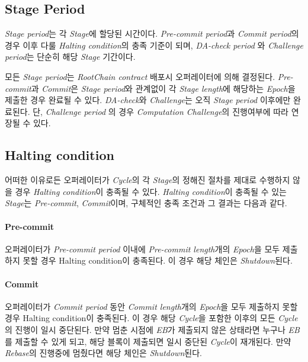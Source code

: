 \documentclass[letterpaper, 11pt]{article}
\begin{document}
\subsection{Stage Period}
\begin{CJK}{UTF8}{mj}
\emph{Stage period}는 각 \emph{Stage}에 할당된 시간이다. \emph{Pre-commit period}과 \emph{Commit period}의 경우 이후 다룰 \emph{Halting condition}의 충족 기준이 되며, \emph{DA-check period} 와 \emph{Challenge period}는 단순히 해당 \emph{Stage} 기간이다.

모든 \emph{Stage period}는 \emph{RootChain contract} 배포시 오퍼레이터에 의해 결정된다. \emph{Pre-commit}과 \emph{Commit}은 \emph{Stage period}와 관계없이 각 \emph{Stage length}에 해당하는 \emph{Epoch}을 제출한 경우 완료될 수 있다. \emph{DA-check}와 \emph{Challenge}는 오직 \emph{Stage period} 이후에만 완료된다. 단, \emph{Challenge period} 의 경우 \emph{Computation Challenge}의 진행여부에 따라 연장될 수 있다.
\end{CJK}

\subsection{Halting condition}
\begin{CJK}{UTF8}{mj}
어떠한 이유로든 오퍼레이터가 \emph{Cycle}의 각 \emph{Stage}의 정해진 절차를 제대로 수행하지 않을 경우 \emph{Halting condition}이 충족될 수 있다. \emph{Halting condition}이 충족될 수 있는 \emph{Stage}는 \emph{Pre-commit}, \emph{Commit}이며, 구체적인 충족 조건과 그 결과는 다음과 같다.
\end{CJK}

\paragraph{Pre-commit}
\begin{CJK}{UTF8}{mj}
오퍼레이터가 \emph{Pre-commit period} 이내에 \emph{Pre-commit length}개의 \emph{Epoch}을 모두 제출하지 못할 경우 Halting condition이 충족된다. 이 경우 해당 체인은 \emph{Shutdown}된다.
\end{CJK}

\paragraph{Commit}
\begin{CJK}{UTF8}{mj}
오퍼레이터가 \emph{Commit period} 동안 \emph{Commit length}개의 \emph{Epoch}을 모두 제출하지 못할 경우 Halting condition이 충족된다. 이 경우 해당 \emph{Cycle}을 포함한 이후의 모든 \emph{Cycle}의 진행이 일시 중단된다. 만약 멈춘 시점에 \emph{EB}가 제출되지 않은 상태라면 누구나 \emph{EB}를 제출할 수 있게 되고, 해당 블록이 제출되면 일시 중단된 \emph{Cycle}이 재개된다. 만약 \emph{Rebase}의 진행중에 멈췄다면 해당 체인은 \emph{Shutdown}된다.
\end{CJK}
\end{document}
